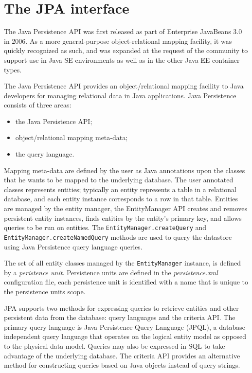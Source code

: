 \section{The JPA interface}
\label{sec:jpa}
The Java Persistence API \cite{book:projpa2} was first released as part of Enterprise JavaBeans 3.0 in 2006. As a more general-purpose object-relational mapping facility, it was quickly recognized as such, and was expanded at the request of the community to support use in Java SE environments as well as in the other Java EE container types.

\newparagraph The Java Persistence API provides an object/relational mapping facility to Java developers for managing relational data in Java applications. Java Persistence consists of three areas:
\begin{itemize}
\item the Java Persistence API;
\item object/relational mapping meta-data;
\item the query language.
\end{itemize}

\noindent Mapping meta-data are defined by the user as Java annotations upon the classes that he wants to be mapped to the underlying database.
The user annotated classes represents entities; typically an entity represents a table in a relational database, and each entity instance corresponds to a row in that table. Entities are managed by the entity manager, the EntityManager API creates and removes persistent entity instances, finds entities by the entity’s primary key, and allows queries to be run on entities. 
The \texttt{EntityManager.createQuery} and \texttt{EntityManager.createNamedQuery} methods are used to query the datastore using Java Persistence query language queries. 

\noindent The set of all entity classes managed by the \texttt{EntityManager} instance, is defined by a \textit{peristence unit}.
Persistence units are defined in the \textit{persistence.xml} configuration file, each persistence unit is identified with a name that is unique to the persistence units scope. 

\newparagraph JPA supports two methods for expressing queries to retrieve entities and other persistent data from the database: query languages and the criteria API. The primary query language is Java Persistence Query Language (JPQL), a database-independent query language that operates on the logical entity model as opposed to the physical data model. Queries may also be expressed in SQL to take advantage of the underlying database. The criteria API provides an alternative method for constructing queries based on Java objects instead of query strings.

